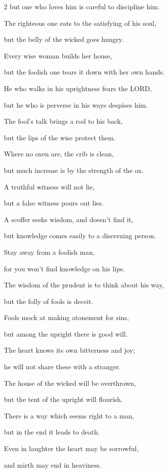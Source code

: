 \begin{multicols}{2}
but one who loves him is careful to discipline him.


\myverse{}The righteous one eats to the satisfying of his soul,

but the belly of the wicked goes hungry.


\mychapter{} \myverse*{}Every wise woman builds her house,

\quad\quad but the foolish one tears it down with her own hands.


\myverse{}He who walks in his uprightness fears the LORD,

but he who is perverse in his ways despises him.


\myverse{}The fool’s talk brings a rod to his back,

but the lips of the wise protect them.


\myverse{}Where no oxen are, the crib is clean,

but much increase is by the strength of the ox.


\myverse{}A truthful witness will not lie,

but a false witness pours out lies.


\myverse{}A scoffer seeks wisdom, and doesn’t find it,

but knowledge comes easily to a discerning person.


\myverse{}Stay away from a foolish man,

for you won’t find knowledge on his lips.


\myverse{}The wisdom of the prudent is to think about his way,

but the folly of fools is deceit.


\myverse{}Fools mock at making atonement for sins,

but among the upright there is good will.


\myverse{}The heart knows its own bitterness and joy;

he will not share these with a stranger.


\myverse{}The house of the wicked will be overthrown,

but the tent of the upright will flourish.


\myverse{}There is a way which seems right to a man,

but in the end it leads to death.


\myverse{}Even in laughter the heart may be sorrowful,

and mirth may end in heaviness.



\end{multicols}
